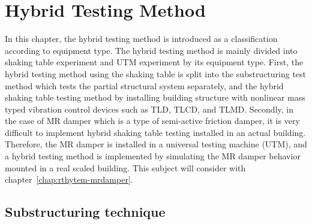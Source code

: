 \chapter{Hybrid Testing Method}
\label{rthytem}
In this chapter, the hybrid testing method is introduced as a classification according to equipment type. The hybrid testing method is mainly divided into shaking table experiment and UTM experiment by its equipment type. First, the hybrid testing method using the shaking table is split into the substructuring test method which tests the partial structural system separately, and the hybrid shaking table testing method by installing building structure with nonlinear mass typed vibration control devices such as TLD, TLCD, and TLMD. Secondly, in the case of MR damper which is a type of semi-active friction damper, it is very difficult to implement hybrid shaking table testing installed in an actual building. Therefore, the MR damper is installed in a universal testing machine (UTM), and a hybrid testing method is implemented by simulating the MR damper behavior mounted in a real scaled building. This subject will consider with chapter~\ref{chap:rthytem-mrdamper}.

\section{Substructuring technique}
\label{chap:realtimesubstrct}

